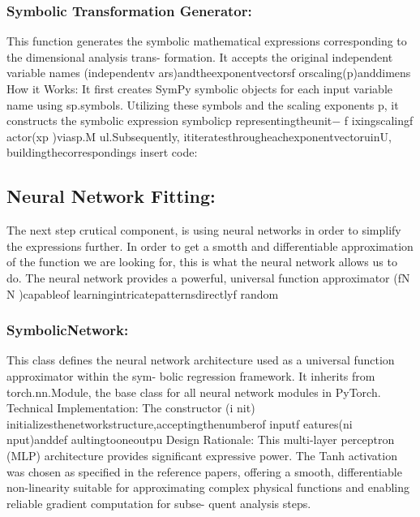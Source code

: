 \documentclass{article}
\begin{document}
{\subsubsection{Symbolic Transformation Generator: }

This function generates the symbolic mathematical expressions corresponding to the dimensional analysis trans-
formation. It accepts the original independent variable names (independentv ars)andtheexponentvectorsf orscaling(p)anddimens
How it Works: It first creates SymPy symbolic objects for each input variable name using sp.symbols. Utilizing
these symbols and the scaling exponents p, it constructs the symbolic expression symbolicp representingtheunit−
f ixingscalingf actor(xp )viasp.M ul.Subsequently, ititeratesthrougheachexponentvectoruinU, buildingthecorrespondings
insert code:\\


\subsection{Neural Network Fitting: }

The next step crutical component, is using neural networks in order to simplify the expressions further.
In order to get a smotth and differentiable approximation of the function we are looking for, this is what the
neural network allows us to do.
The neural network provides a powerful, universal function approximator (fN N )capableof learningintricatepatternsdirectlyf random\\


\subsubsection{SymbolicNetwork:}

This class defines the neural network architecture used as a universal function approximator within the sym-
bolic regression framework. It inherits from torch.nn.Module, the base class for all neural network modules in
PyTorch.
Technical Implementation: The constructor (i nit) initializesthenetworkstructure,acceptingthenumberof inputf eatures(ni nput)anddef aultingtooneoutpu
Design Rationale: This multi-layer perceptron (MLP) architecture provides significant expressive power. The
Tanh activation was chosen as specified in the reference papers, offering a smooth, differentiable non-linearity
suitable for approximating complex physical functions and enabling reliable gradient computation for subse-
quent analysis steps.\\ 


}
\end{document}
